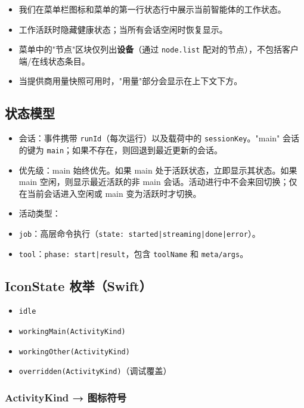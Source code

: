 \begin{itemize}
  \item 我们在菜单栏图标和菜单的第一行状态行中展示当前智能体的工作状态。
  \item 工作活跃时隐藏健康状态；当所有会话空闲时恢复显示。
  \item 菜单中的"节点"区块仅列出\textbf{设备}（通过 \texttt{node.list} 配对的节点），不包括客户端/在线状态条目。
  \item 当提供商用量快照可用时，"用量"部分会显示在上下文下方。
\end{itemize}


\subsection{状态模型}


\begin{itemize}
  \item 会话：事件携带 \texttt{runId}（每次运行）以及载荷中的 \texttt{sessionKey}。"main" 会话的键为 \texttt{main}；如果不存在，则回退到最近更新的会话。
  \item 优先级：main 始终优先。如果 main 处于活跃状态，立即显示其状态。如果 main 空闲，则显示最近活跃的非 main 会话。活动进行中不会来回切换；仅在当前会话进入空闲或 main 变为活跃时才切换。
  \item 活动类型：
  \item \texttt{job}：高层命令执行（\texttt{state: started|streaming|done|error}）。
  \item \texttt{tool}：\texttt{phase: start|result}，包含 \texttt{toolName} 和 \texttt{meta/args}。
\end{itemize}


\subsection{IconState 枚举（Swift）}


\begin{itemize}
  \item \texttt{idle}
  \item \texttt{workingMain(ActivityKind)}
  \item \texttt{workingOther(ActivityKind)}
  \item \texttt{overridden(ActivityKind)}（调试覆盖）
\end{itemize}


\subsubsection{ActivityKind → 图标符号}


